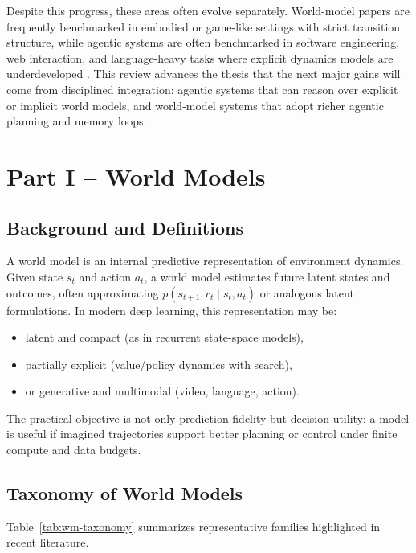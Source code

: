 \documentclass[conference]{IEEEtran}
\begin{document}
Despite this progress, these areas often evolve separately. World-model papers are frequently benchmarked in embodied or game-like settings with strict transition structure, while agentic systems are often benchmarked in software engineering, web interaction, and language-heavy tasks where explicit dynamics models are underdeveloped \cite{liu2024agentbench, jimenez2024swebench, zhou2024webarena}. This review advances the thesis that the next major gains will come from disciplined integration: agentic systems that can reason over explicit or implicit world models, and world-model systems that adopt richer agentic planning and memory loops.

\section{Part I -- World Models}
\subsection{Background and Definitions}
A world model is an internal predictive representation of environment dynamics. Given state $s_t$ and action $a_t$, a world model estimates future latent states and outcomes, often approximating $p(s_{t+1}, r_t \mid s_t, a_t)$ or analogous latent formulations. In modern deep learning, this representation may be:
\begin{itemize}
\item latent and compact (as in recurrent state-space models),
\item partially explicit (value/policy dynamics with search),
\item or generative and multimodal (video, language, action).
\end{itemize}

The practical objective is not only prediction fidelity but decision utility: a model is useful if imagined trajectories support better planning or control under finite compute and data budgets.

\subsection{Taxonomy of World Models}
Table~\ref{tab:wm-taxonomy} summarizes representative families highlighted in recent literature.
\end{document}
